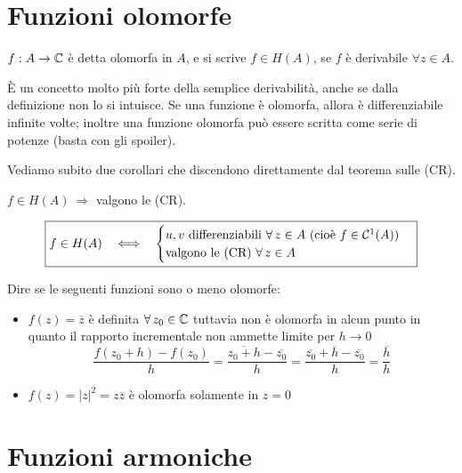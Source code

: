 \section{Funzioni olomorfe}

\begin{defn}
$f:A\rightarrow\mathbb{C}$ è detta olomorfa in $A$, e si scrive $f\in H(A)$, se $f$ è derivabile $\forall z \in A$.
\end{defn}
È un concetto molto più forte della semplice derivabilità, anche se dalla definizione non lo si intuisce. Se una funzione è olomorfa, allora è differenziabile infinite volte; inoltre una funzione olomorfa può essere scritta come serie di potenze (basta con gli spoiler).

Vediamo subito due corollari che discendono direttamente dal teorema sulle (CR).

\begin{thm}
$f\in H(A)\ \Rightarrow$ valgono le (CR).
\end{thm}

\begin{thm}
\begin{equation*}
\boxed{f\in H(A) \ \ \iff \ \
\begin{cases}
u, v\ \text{differenziabili }\forall z\in A\ (\text{cioè }f\in\Cc^1(A)) \\
\text{valgono le (CR) } \forall z\in A
\end{cases}}
\end{equation*}
\end{thm}

\begin{exa}
Dire se le seguenti funzioni sono o meno olomorfe:
\begin{itemize}
    \item $f(z)=\overline{z}$ è definita $\forall z_0\in\CC$ tuttavia non è olomorfa in alcun punto in quanto il rapporto incrementale non ammette limite per $h\to 0$
    \begin{equation*}
    \frac{f(z_0+h)-f(z_0)}{h}=\frac{\overline{z_0+h}-\overline{z_0}}{h}=\frac{\overline{z_0}+\overline{h}-\overline{z_0}}{h}=\frac{\overline{h}}{h}
    \end{equation*}
    \item $f(z)=|z|^2=z\overline{z}$ è olomorfa solamente in $z=0$
\end{itemize}
\end{exa}

\section{Funzioni armoniche}

